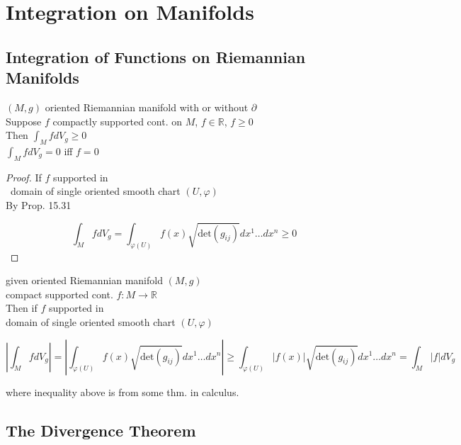 \section{Integration on Manifolds}


\subsection*{Integration of Functions on Riemannian Manifolds}

\begin{proposition}[16.28]
  $(M,g)$ oriented Riemannian manifold with or without $\partial$ \\
Suppose $f$ compactly supported cont. on $M$, $f\in \mathbb{R}$, $f\geq 0$ \\
Then $\int_M f dV_g \geq 0$ \\
\phantom{Then } $\int_M f dV_g = 0$ iff $f=0$
\end{proposition}

\begin{proof}
  If $f$ supported in \\
\quad \, domain of single oriented smooth chart $(U,\varphi)$  \\

By Prop. 15.31


\[
\int_M f dV_g = \int_{ \varphi{(U)}} f(x) \sqrt{ \text{det}{ (g_{ij} ) } } dx^1 \dots dx^n \geq 0
\]




\end{proof}

 given oriented Riemannian manifold $(M,g)$ \\
\quad compact supported cont. $f: M \to \mathbb{R}$ \\

Then if $f$ supported in \\
\phantom{Then } domain of single oriented smooth chart $(U,\varphi)$ 

\[
\left| \int_M f dV_g \right| = \left| \int_{ \varphi{ (U)} } f(x) \sqrt{ \text{det}{ (g_{ij} )} } dx^1 \dots dx^n \right| \geq \int_{\varphi{ (U)} } |f(x) | \sqrt{ \text{det}{ (g_{ij})} } dx^1 \dots dx^n = \int_M |f| dV_g
\]

where inequality above is from some thm. in calculus.  

\hrulefill

\subsection*{The Divergence Theorem}


